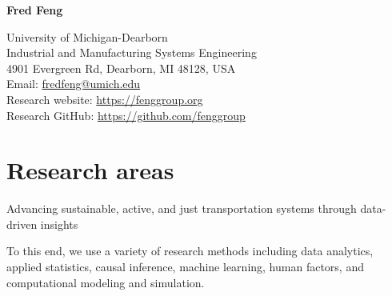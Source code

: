 \documentclass[11pt]{article}
\title{\vspace{-5em}}   %
\author{}
\date{}
\newenvironment{main}
{\begin{adjustwidth}{3em}{}}
{\end{adjustwidth}}
\begin{document}
\maketitle

\begin{multicols}{2}

{\Huge\textbf{Fred Feng}}  %


\hfill\break
\hfill\break
\hfill\break
\hfill\break
\hfill\break

\begin{flushright}
{
University of Michigan-Dearborn\\
Industrial and Manufacturing Systems Engineering\\
4901 Evergreen Rd, Dearborn, MI 48128, USA\\
Email: \href{mailto:fredfeng@umich.edu}{fredfeng@umich.edu}\\
Research website: \url{https://fenggroup.org}\\
Research GitHub: \url{https://github.com/fenggroup}\\
}
\end{flushright}
\end{multicols}

\vspace{-10ex}
\noindent\makebox[\linewidth]{\rule{\textwidth}{0.8pt}}

\section*{Research areas}
\begin{main}


Advancing sustainable, active, and just transportation systems through data-driven insights

To this end, we use a variety of research methods including 
data analytics, 
applied statistics, 
causal inference, 
machine learning, 
human factors, 
and computational modeling and simulation.



\end{main}
\end{document}
